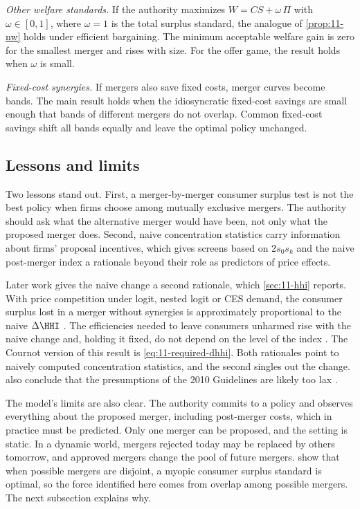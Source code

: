\emph{Other welfare standards.} If the authority maximizes $W = \mathit{CS} + \omega\,\Pi$ with $\omega \in [0, 1]$,
where $\omega = 1$ is the total surplus standard, the analogue of \cref{prop:11-nw} holds under efficient bargaining. The
minimum acceptable welfare gain is zero for the smallest merger and rises with size. For the offer game, the result holds
when $\omega$ is small.

\emph{Fixed-cost synergies.} If mergers also save fixed costs, merger curves become bands. The main result holds when the
idiosyncratic fixed-cost savings are small enough that bands of different mergers do not overlap. Common fixed-cost
savings shift all bands equally and leave the optimal policy unchanged.

\subsection{Lessons and limits}\label{sec:11-nw-lessons}

Two lessons stand out. First, a merger-by-merger consumer surplus test is not the best policy when firms choose among
mutually exclusive mergers. The authority should ask what the alternative merger would have been, not only what the
proposed merger does. Second, naive concentration statistics carry information about firms' proposal incentives, which
gives screens based on $2s_0s_k$ and the naive post-merger index a rationale beyond their role as predictors of price
effects.

Later work gives the naive change a second rationale, which \cref{sec:11-hhi} reports. With price competition under
logit, nested logit or CES demand, the consumer surplus lost in a merger without synergies is approximately
proportional to the naive $\Delta\HHI$ \citep{NockeSchutz2019}. The efficiencies needed to leave consumers unharmed
rise with the naive change and, holding it fixed, do not depend on the level of the index \citep{NockeWhinston2020}.
The Cournot version of this result is \eqref{eq:11-required-dhhi}. Both rationales point to naively computed
concentration statistics, and the second singles out the change. \citet{NockeWhinston2020} also conclude that the
presumptions of the 2010 Guidelines are likely too lax \citep[p.~227, n.~124]{AskerNocke2021}.

The model's limits are also clear. The authority commits to a policy and observes everything about the proposed merger,
including post-merger costs, which in practice must be predicted. Only one merger can be proposed, and the setting is
static. In a dynamic world, mergers rejected today may be replaced by others tomorrow, and approved mergers change the
pool of future mergers. \citet{NockeWhinston2010} show that when possible mergers are disjoint, a myopic consumer surplus
standard is optimal, so the force identified here comes from overlap among possible mergers. The next subsection
explains why.

